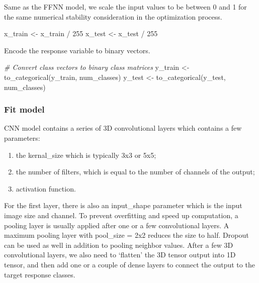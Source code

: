 \documentclass[
  12pt,
]{krantz}
\makeatletter
\newenvironment{Shaded}{\begin{snugshade}}{\end{snugshade}}
\newcommand{\CommentTok}[1]{\textcolor[rgb]{0.37,0.37,0.37}{\textit{#1}}}
\newcommand{\DecValTok}[1]{\textcolor[rgb]{0.06,0.06,0.06}{#1}}
\newcommand{\FunctionTok}[1]{\textcolor[rgb]{0,0,0}{#1}}
\newcommand{\NormalTok}[1]{#1}
\newcommand{\OtherTok}[1]{\textcolor[rgb]{0.37,0.37,0.37}{#1}}
\newcommand{\SpecialCharTok}[1]{\textcolor[rgb]{0,0,0}{#1}}
\newenvironment{kframe}{%
\medskip{}
\setlength{\fboxsep}{.8em}
 \def\at@end@of@kframe{}%
 \ifinner\ifhmode%
  \def\at@end@of@kframe{\end{minipage}}%
  \begin{minipage}{\columnwidth}%
 \fi\fi%
 \def\FrameCommand##1{\hskip\@totalleftmargin \hskip-\fboxsep
 \colorbox{shadecolor}{##1}\hskip-\fboxsep
     \hskip-\linewidth \hskip-\@totalleftmargin \hskip\columnwidth}%
 \MakeFramed {\advance\hsize-\width
   \@totalleftmargin\z@ \linewidth\hsize
   \@setminipage}}%
 {\par\unskip\endMakeFramed%
 \at@end@of@kframe}
\renewenvironment{Shaded}{\begin{kframe}}{\end{kframe}}
\makeatother
\begin{document}
Same as the FFNN model, we scale the input values to be between 0 and 1 for the same numerical stability consideration in the optimization process.

\begin{Shaded}
\begin{Highlighting}[]
\NormalTok{x\_train }\OtherTok{\textless{}{-}}\NormalTok{ x\_train }\SpecialCharTok{/} \DecValTok{255}
\NormalTok{x\_test }\OtherTok{\textless{}{-}}\NormalTok{ x\_test }\SpecialCharTok{/} \DecValTok{255}
\end{Highlighting}
\end{Shaded}

Encode the response variable to binary vectors.

\begin{Shaded}
\begin{Highlighting}[]
\CommentTok{\# Convert class vectors to binary class matrices}
\NormalTok{y\_train }\OtherTok{\textless{}{-}} \FunctionTok{to\_categorical}\NormalTok{(y\_train, num\_classes)}
\NormalTok{y\_test }\OtherTok{\textless{}{-}} \FunctionTok{to\_categorical}\NormalTok{(y\_test, num\_classes)}
\end{Highlighting}
\end{Shaded}

\hypertarget{fit-model-1}{%
\subsubsection{Fit model}\label{fit-model-1}}

CNN model contains a series of 3D convolutional layers which contains a few parameters:

\begin{enumerate}
\def\labelenumi{(\arabic{enumi})}
\item
  the kernal\_size which is typically 3x3 or 5x5;
\item
  the number of filters, which is equal to the number of channels of the output;
\item
  activation function.
\end{enumerate}

For the first layer, there is also an input\_shape parameter which is the input image size and channel. To prevent overfitting and speed up computation, a pooling layer is usually applied after one or a few convolutional layers. A maximum pooling layer with pool\_size = 2x2 reduces the size to half. Dropout can be used as well in addition to pooling neighbor values. After a few 3D convolutional layers, we also need to `flatten' the 3D tensor output into 1D tensor, and then add one or a couple of dense layers to connect the output to the target response classes.
\end{document}
